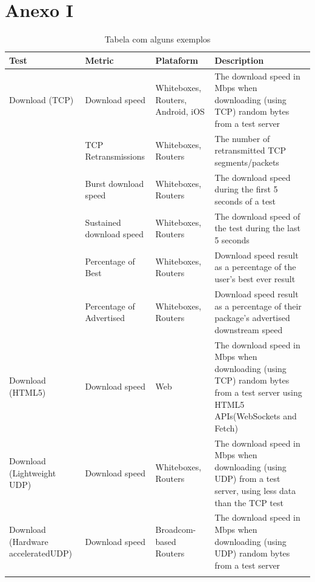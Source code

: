 \documentclass{llncs}
\begin{document}
\newpage
\section{Anexo I}
\label{sec:anexo_I}

\begin{table}
\centering
\begin{longtable}{p{} p{} p{} p{}}
\label{tbl:2}


\\\textbf{Test} & \textbf{Metric} & \textbf{Plataform} & \textbf{Description}\\
\hline\hline
Download (TCP) & Download speed & Whiteboxes, Routers, Android, iOS & The download speed in Mbps when downloading (using TCP) random bytes from a test server \\ 
\hline 
  & TCP Retransmissions & Whiteboxes, Routers & The number of retransmitted TCP segments/packets \\ 
\hline
  & Burst download speed & Whiteboxes, Routers & The download speed during the first 5 seconds of a test \\ 
\hline 
  & Sustained download speed & Whiteboxes, Routers & The download speed of the test during the last 5 seconds \\ 
\hline 
  & Percentage of Best & Whiteboxes, Routers & Download speed result as a percentage of the user's best ever result \\ 
\hline 
  & Percentage of Advertised & Whiteboxes, Routers & Download speed result as a percentage of their package's advertised downstream speed \\ 
\hline 
Download (HTML5) & Download speed & Web & The download speed in Mbps when downloading (using TCP) random bytes from a test server using HTML5 APIs(WebSockets and Fetch) \\ 
\hline 
Download (Lightweight UDP) & Download speed & Whiteboxes, Routers & The download speed in Mbps when downloading (using UDP) from a test server, using less data than the TCP test \\ 
\hline 
Download (Hardware acceleratedUDP) & Download speed & Broadcom-based Routers & The download speed in Mbps when downloading (using UDP) random bytes from a test server \\
\hline 
\caption{Tabela com alguns exemplos}
\end{longtable}
\end{table}
%
\end{document}
